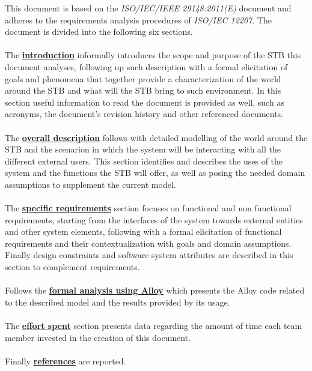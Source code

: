 \documentclass[11pt]{article}
\begin{document}
This document is based on the \textit{ISO/IEC/IEEE 29148:2011(E)} document and adheres to the requirements analysis procedures of \textit{ISO/IEC 12207}. The document is divided into the following six sections. \\
\\
The \hyperref[section:introduction]{\textbf{introduction}} informally introduces the scope and purpose of the STB this document analyses, following up such description with a formal elicitation of goals and phenomena that together provide a characterization of the world around the STB and what will the STB bring to such environment. In this section useful information to read the document is provided as well, such as acronyms, the document's revision history and other referenced documents. \\
\\
The \hyperref[section:overallDescription]{\textbf{overall description}} follows with detailed modelling of the world around the STB and the scenarion in which the system will be interacting with all the different external users. This section identifies and describes the uses of the system and the functions the STB will offer, as well as posing the needed domain assumptions to supplement the current model. \\
\\
The \hyperref[section:specificRequirements]{\textbf{specific requirements}} section focuses on functional and non functional requirements, starting from the interfaces of the system towards external entities and other system elements, following with a formal elicitation of functional requirements and their contextualization with goals and domain assumptions. Finally design constraints and software system attributes are described in this section to complement requirements. \\
\\
Follows the \hyperref[section:alloy]{\textbf{formal analysis using Alloy}} which presents the Alloy code related to the described model and the results provided by its usage. \\
\\
The \hyperref[section:effort]{\textbf{effort spent}} section presents data regarding the amount of time each team member invested in the creation of this document. \\
\\
Finally \hyperref[section:references]{\textbf{references}} are reported.

\newpage
\end{document}
